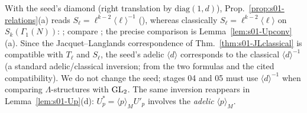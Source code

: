 \begin{remark}\label{rem:s01-diamond}
With the seed's diamond (right translation by $\mathrm{diag}(1,d)$), Prop.~\ref{prop:s01-relations}(a) reads
$S_\ell=\ell^{k-2}\langle\ell\rangle^{-1}$ (\stproved), whereas classically $S_\ell=\ell^{k-2}\langle\ell\rangle$ on $S_k(\Gamma_1(N))$:
\stknown; compare ; the precise comparison is Lemma~\ref{lem:s01-Upconv}(a).
Since the Jacquet--Langlands correspondence of Thm.~\ref{thm:s01-JLclassical} is compatible with $T_\ell$ and $S_\ell$, the seed's
adelic $\langle d\rangle$ corresponds to the classical $\langle d\rangle^{-1}$ (a standard adelic/classical inversion; \stpmc{} from the two
formulas and the cited compatibility). We do not change the seed; stages 04 and 05 must use $\langle d\rangle^{-1}$ when comparing
$\Lambda$-structures with $\mathrm{GL}_2$. The same inversion reappears in Lemma~\ref{lem:s01-Up}(d): $U_p^*=\langle p\rangle_MU'_p$ involves the
\emph{adelic} $\langle p\rangle_M$.
\end{remark}

